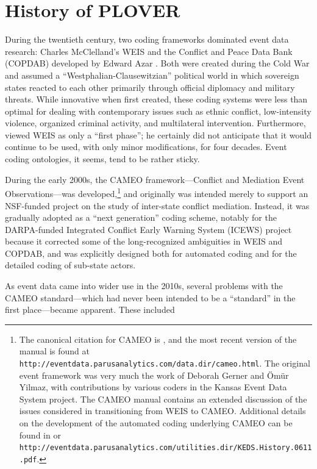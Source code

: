 \documentclass[11pt]{report}
\begin{document}
\section{History of \textsc{PLOVER}}

During the twentieth century, two coding frameworks dominated event data research: Charles McClelland's WEIS \citep{McClelland67,McClelland76}  and the Conflict and Peace Data Bank (COPDAB) developed by Edward Azar \citep{AzarSloan75, Azar80, Azar82}. Both were created during the Cold War and assumed a ``Westphalian-Clausewitzian'' political world in which sovereign states reacted to each other primarily through official diplomacy
and military threats. While innovative when first created, these coding systems were less than optimal for dealing with contemporary issues such as ethnic conflict, low-intensity violence, organized criminal activity, and multilateral intervention. Furthermore, \citet[pg. 177]{McClelland83} viewed WEIS as only a ``first phase''; he certainly did not anticipate that it would continue to be used, with only minor modifications, for four decades. Event coding ontologies, it seems, tend to be rather sticky.

During the early 2000s, the CAMEO framework---Conflict and Mediation Event Observations---was developed,\footnote{The canonical citation for CAMEO is \cite{SGY09}, and the most recent version of the manual is found at \texttt{http://eventdata.parusanalytics.com/data.dir/cameo.html}.  The original event framework was very much the work of Deborah Gerner and \"Om\"ur Yilmaz, with contributions by various coders in the Kansas Event Data System project. The CAMEO manual contains an extended discussion of the issues considered in transitioning from WEIS to CAMEO. Additional details on the development of the automated coding underlying CAMEO can be found in \cite{Schrodt06TPM} or \texttt{http://eventdata.parusanalytics.com/utilities.dir/KEDS.History.0611.pdf}. } and originally was intended merely to support an NSF-funded project on the study of inter-state conflict mediation. Instead, it was gradually adopted as a ``next generation'' coding scheme, notably for the DARPA-funded Integrated Conflict Early Warning System (ICEWS) project \citep{OBrien10} because it corrected some of the long-recognized ambiguities in WEIS and COPDAB, and was explicitly designed both for automated coding and for the detailed coding of sub-state actors. 

As event data came into wider use in the 2010s, several problems with the CAMEO standard---which had never been intended to be a ``standard'' in the first place---became apparent. These included
\end{document}
